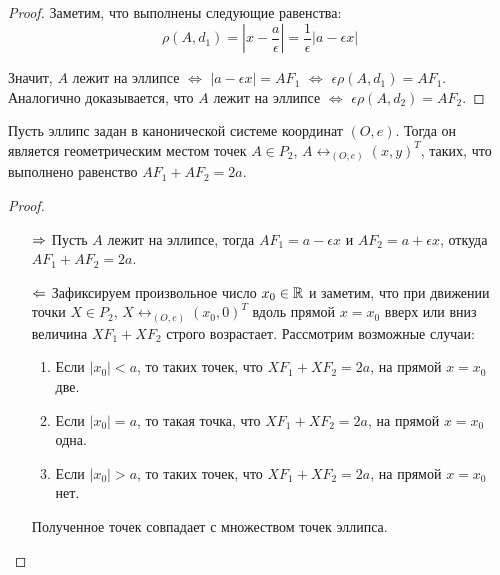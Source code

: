 \begin{proof}
	Заметим, что выполнены следующие равенства:
	\[\rho(A, d_1) = \left|x - \frac{a}{\epsilon}\right| = \frac{1}{\epsilon}|a - \epsilon x|\]
	
	Значит, $A$ лежит на эллипсе $\Leftrightarrow$ $|a - \epsilon x| = AF_1$ $\Leftrightarrow$ $\epsilon\rho(A, d_1) = AF_1$. Аналогично доказывается, что $A$ лежит на эллипсе $\Leftrightarrow$ $\epsilon\rho(A, d_2) = AF_2$.
\end{proof}

\begin{theorem}
	Пусть эллипс задан в канонической системе координат $(O, e)$. Тогда он является геометрическим местом точек $A \in P_2$, $A \leftrightarrow_{(O, e)} (x, y)^T$, таких, что выполнено равенство $AF_1 + AF_2 = 2a$.
\end{theorem}

\begin{proof}~
	\begin{itemize}
		\item[$\Rightarrow$] Пусть $A$ лежит на эллипсе, тогда $AF_1 = a - \epsilon x$ и $AF_2 = a + \epsilon x$, откуда $AF_1 + AF_2 = 2a$.
		\item[$\Leftarrow$] Зафиксируем произвольное число $x_0 \in \mathbb{R}$ и заметим, что при движении точки $X \in P_2$, $X \leftrightarrow_{(O, e)} (x_0, 0)^T$ вдоль прямой $x = x_0$ вверх или вниз величина $XF_1 + XF_2$ строго возрастает. Рассмотрим возможные случаи:
		\begin{enumerate}
			\item Если $|x_0| < a$, то таких точек, что $XF_1 + XF_2 = 2a$, на прямой $x = x_0$ две.
			\item Если $|x_0| = a$, то такая точка, что $XF_1 + XF_2 = 2a$, на прямой $x = x_0$ одна.
			\item Если $|x_0| > a$, то таких точек, что $XF_1 + XF_2 = 2a$, на прямой $x = x_0$ нет.
		\end{enumerate}
	
	Полученное точек совпадает с множеством точек эллипса.\qedhere
	\end{itemize}
\end{proof}

